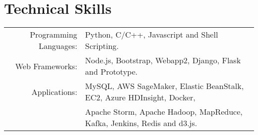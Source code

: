 \section{Technical Skills}
\renewcommand{\arraystretch}{1}%
\begin{tabular}{rl}

Programming Languages: &  Python, C/C++, Javascript and Shell Scripting.\\
Web Frameworks: & Node.js, Bootstrap, Webapp2, Django, Flask and Prototype.\\
Applications: & MySQL, AWS SageMaker, Elastic BeanStalk, EC2, Azure HDInsight, Docker,\\
& Apache Storm, Apache Hadoop, MapReduce, Kafka, Jenkins, Redis and d3.js.\\
\end{tabular}
\vspace{5pt}
